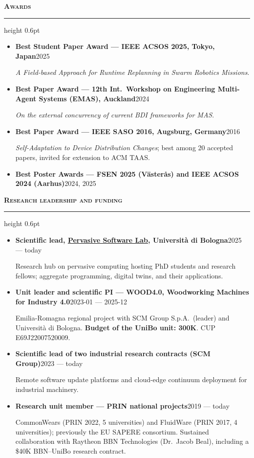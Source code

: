 \documentclass[a4paper,9pt]{extarticle}
\newcommand{\cvsection}[1]{%
  \par\vspace{3.5pt}%
  {\normalsize\bfseries\scshape #1}\par\vspace{1pt}%
  \hrule height 0.6pt\vspace{2.5pt}\par}
\newcommand{\entry}[2]{\textbf{#1}\hspace{1em}\hfill{\small #2}\par}
\begin{document}
\cvsection{Awards}
\begin{itemize}
\item \entry{Best Student Paper Award --- IEEE ACSOS 2025, Tokyo, Japan}{2025}
      \emph{A Field-based Approach for Runtime Replanning in Swarm Robotics Missions}.
\item \entry{Best Paper Award --- 12th Int.\ Workshop on Engineering Multi-Agent Systems (EMAS), Auckland}{2024}
      \emph{On the external concurrency of current BDI frameworks for MAS}.
\item \entry{Best Paper Award --- IEEE SASO 2016, Augsburg, Germany}{2016}
      \emph{Self-Adaptation to Device Distribution Changes}; best among 20 accepted papers,
      invited for extension to ACM TAAS.
\item \entry{Best Poster Awards --- FSEN 2025 (V\"aster\r{a}s) and IEEE ACSOS 2024 (Aarhus)}{2024, 2025}
\end{itemize}

\cvsection{Research leadership and funding}
\begin{itemize}
\item \entry{Scientific lead, \href{https://pslab-unibo.github.io/}{Pervasive Software Lab}, Universit\`a di Bologna}{2025 --- today}
      Research hub on pervasive computing hosting PhD students and research fellows;
      aggregate programming, digital twins, and their applications.
\item \entry{Unit leader and scientific PI --- WOOD4.0, Woodworking Machines for Industry 4.0}{2023-01 --- 2025-12}
      Emilia-Romagna regional project with SCM Group S.p.A.\ (leader) and Universit\`a di Bologna.
      \textbf{Budget of the UniBo unit: \texteuro{}300K}. CUP E69J22007520009.
\item \entry{Scientific lead of two industrial research contracts (SCM Group)}{2023 --- today}
      Remote software update platforms and cloud-edge continuum deployment for industrial machinery.
\item \entry{Research unit member --- PRIN national projects}{2019 --- today}
      CommonWears (PRIN 2022, 5 universities) and FluidWare (PRIN 2017, 4 universities);
      previously the EU SAPERE consortium. Sustained collaboration with Raytheon BBN
      Technologies (Dr.\ Jacob Beal), including a \$40K BBN--UniBo research contract.
\end{itemize}
\end{document}
